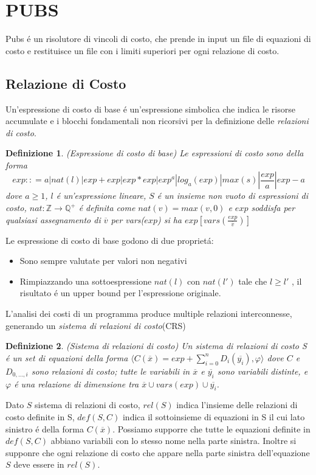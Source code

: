 \documentclass[../../main.tex]{subfiles}
\begin{document}
\section{PUBS}
\label{sec:pubs}
Pubs é un risolutore di vincoli di costo, che prende in input un file di equazioni di costo e restituisce un file con i limiti superiori per ogni relazione di costo.

\subsection{Relazione di Costo}
Un'espressione di costo di base é un'espressione simbolica che indica le risorse accumulate e i blocchi fondamentali non ricorsivi per la definizione delle \textit{relazioni di costo}.
\newtheorem{definition}{Definizione}
\begin{definition}(Espressione di costo di base)
Le espressioni di costo sono della forma $$exp :: = a | nat(l) | exp + exp | exp * exp |exp^a |log _a (exp) | max(s) | \frac{exp}{a} | exp - a   $$
dove $a \geq 1$, $l$ é un'espressione lineare, $S$ é un insieme non vuoto di espressioni di costo, $nat : \mathbb{Z}  \rightarrow \mathbb{Q} ^+$ é definita come $nat(v) = max({v,0})$ e $exp$ soddisfa per qualsiasi assegnamento di $\overline{v}$ per vars($exp$) si ha $exp[ vars(\frac{exp}{\overline{v}})]$
\end{definition}
Le espressione di costo di base godono di due proprietá:
\begin{itemize}
    \item Sono sempre valutate per valori non negativi
    \item Rimpiazzando una sottoespressione $nat(l)$ con $nat(l')$ tale che $l \geq l'$ , il risultato é un upper bound per l'espressione originale.
\end{itemize}
L'analisi dei costi di un programma produce multiple relazioni interconnesse, generando un \textit{sistema di relazioni di costo}(CRS)

\begin{definition}(Sistema di relazioni di costo)
    Un sistema di relazioni di costo S é un set di equazioni della forma $\langle C(\overline{x}) = exp + \sum_{i = 0}^n D_i(\overline{y_i}), \varphi \rangle$  dove $C$ e $D_{0,\dots, i}$ sono relazioni di costo; tutte le variabili in $\overline{x}$ e $\overline{y_i}$ sono variabili distinte, e $\varphi$ é una relazione di dimensione tra  $\overline{x} \cup vars(exp) \cup \overline{y_i}$.
\end{definition}
Dato $S$ sistema di relazioni di costo, $rel(S)$ indica l'insieme delle relazioni di costo definite in S, $def(S,C)$ indica il sottoinsieme di equazioni in S il cui lato sinistro é della forma $C(\overline{x})$.
Possiamo supporre che tutte le equazioni definite in $def(S,C)$ abbiano variabili con lo stesso nome nella parte sinistra.
Inoltre si supponre che ogni relazione di costo che appare nella parte sinistra dell'equazione $S$ deve essere in $rel(S)$.
\end{document}
